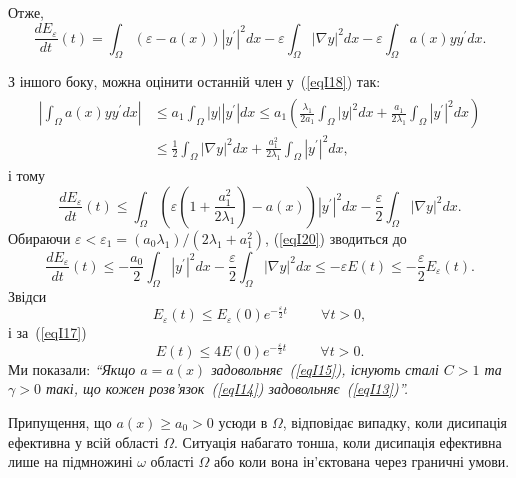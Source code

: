 Отже,
\begin{equation}\label{eqI18}
\frac{dE_\varepsilon}{dt}(t) = \int_\Omega \left( \varepsilon - a(x) \right) |y^\prime|^2 dx - \varepsilon \int_\Omega |\nabla y|^2 dx - \varepsilon \int_\Omega a(x)yy^\prime dx.
\end{equation}

З іншого боку, можна оцінити останній член у~(\ref{eqI18}) так:
\begin{align}\label{eqI19}
\begin{split}
\left| \int_\Omega a(x)yy^\prime dx \right| & \leq a_1 \int_\Omega |y| |y^\prime| dx
 \leq a_1 \left( \frac{\lambda_1}{2a_1} \int_\Omega |y|^2 dx + \frac{a_1}{2\lambda_1} \int_\Omega |y^\prime|^2 dx \right)
\\ & \leq \frac{1}{2} \int_\Omega |\nabla y|^2 dx + \frac{a^2_1}{2\lambda_1} \int_\Omega |y^\prime|^2 dx,
\end{split}
\end{align}
і тому
\begin{equation}\label{eqI20}
\frac{dE_\varepsilon}{dt}(t) \leq \int_\Omega \left( \varepsilon \left(1 + \frac{a^2_1}{2 \lambda_1} \right) - a(x) \right) |y^\prime|^2 dx - \frac{\varepsilon}{2} \int_\Omega |\nabla y|^2 dx.
\end{equation}
Обираючи
$
\varepsilon < \varepsilon_1 = (a_0 \lambda_1)/(2 \lambda_1 + a^2_1)
$,
(\ref{eqI20}) зводиться до
\begin{equation*}
\frac{dE_\varepsilon}{dt}(t) \leq - \frac{a_0}{2} \int_\Omega |y^\prime|^2 dx - \frac{\varepsilon}{2} \int_\Omega |\nabla y|^2 dx \leq -\varepsilon E(t) \leq -\frac{\varepsilon}{2} E_\varepsilon (t).
\end{equation*}
Звідси
\begin{equation}\label{eqI21}
E_\varepsilon (t) \leq E_\varepsilon (0)e^{-\frac{\varepsilon}{2}t} \hspace{1cm} \forall t >0,
\end{equation}
і за~(\ref{eqI17})
\begin{equation}\label{eqI22}
E(t) \leq 4E(0)e^{-\frac{\varepsilon}{2}t} \hspace{1cm} \forall t >0.
\end{equation}
Ми показали: \emph{``Якщо $a = a(x)$ задовольняє~(\ref{eqI15}), існують сталі $C>1$ та $\gamma > 0$ такі, що кожен розв'язок~(\ref{eqI14}) задовольняє~(\ref{eqI13})''.}

Припущення, що $a(x)\geq a_0 > 0$ усюди в $\Omega$, відповідає випадку, коли дисипація ефективна у всій області $\Omega$. Ситуація набагато тонша, коли дисипація ефективна лише на підмножині $\omega$ області $\Omega$ або коли вона ін'єктована через граничні умови.



